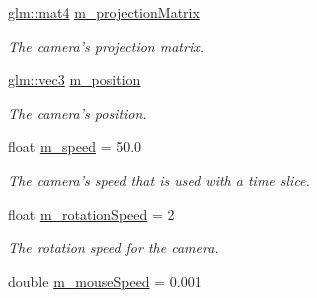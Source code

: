 \begin{CompactItemize}
\item 
\hypertarget{class_camera_26d7567bf34d14260f887a0382aeae29}{
\hyperlink{group__core__types_g7dcd2365c2e368e6af5b7adeb6a9c8df}{glm::mat4} \hyperlink{class_camera_26d7567bf34d14260f887a0382aeae29}{m\_\-projectionMatrix}}
\label{class_camera_26d7567bf34d14260f887a0382aeae29}

\begin{CompactList}\small\item\em The camera's projection matrix. \item\end{CompactList}\item 
\hypertarget{class_camera_a4d06d49524248f81823444fa2544da0}{
\hyperlink{group__core__types_g1c47e8b3386109bc992b6c48e91b0be7}{glm::vec3} \hyperlink{class_camera_a4d06d49524248f81823444fa2544da0}{m\_\-position}}
\label{class_camera_a4d06d49524248f81823444fa2544da0}

\begin{CompactList}\small\item\em The camera's position. \item\end{CompactList}\item 
\hypertarget{class_camera_809774c9955a53755048ea80d934e912}{
float \hyperlink{class_camera_809774c9955a53755048ea80d934e912}{m\_\-speed} = 50.0}
\label{class_camera_809774c9955a53755048ea80d934e912}

\begin{CompactList}\small\item\em The camera's speed that is used with a time slice. \item\end{CompactList}\item 
\hypertarget{class_camera_0b1c75781c142e6bb28761224d0b67ce}{
float \hyperlink{class_camera_0b1c75781c142e6bb28761224d0b67ce}{m\_\-rotationSpeed} = 2}
\label{class_camera_0b1c75781c142e6bb28761224d0b67ce}

\begin{CompactList}\small\item\em The rotation speed for the camera. \item\end{CompactList}\item 
\hypertarget{class_camera_800e33ab274f130f97e5e51d821476ac}{
double \hyperlink{class_camera_800e33ab274f130f97e5e51d821476ac}{m\_\-mouseSpeed} = 0.001}
\label{class_camera_800e33ab274f130f97e5e51d821476ac}


\end{CompactItemize}
